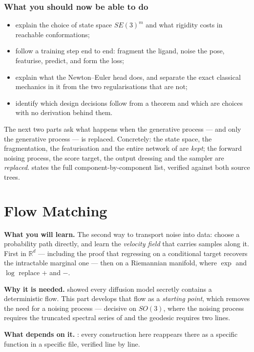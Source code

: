 \documentclass[11pt,a4paper]{report}
\theoremstyle{definition}
\theoremstyle{remark}
\newcommand{\RR}{\mathbb R}
\begin{document}
\section{What you should now be able to do}

\begin{itemize}[nosep]
\item explain the choice of state space $SE(3)^m$ and what rigidity costs in reachable conformations;
\item follow a training step end to end: fragment the ligand, noise the pose, featurise, predict, and form the loss;
\item explain what the Newton--Euler head does, and separate the exact classical mechanics in it from the two regularisations that are not;
\item identify which design decisions follow from a theorem and which are choices with no derivation behind them.
\end{itemize}

The next two parts ask what happens when the generative process --- and only the generative process --- is replaced. Concretely: the state space, the fragmentation, the featurisation and the entire network of  are \emph{kept}; the forward noising process, the score target, the output dressing and the sampler are \emph{replaced}.  states the full component-by-component list, verified against both source trees.

\clearpage

\part{Flow Matching}
\label{part:flow-matching}


\begin{tcolorbox}[colback=gray!4,colframe=gray!55!black,
  title=Part VI at a glance, fonttitle=\bfseries, breakable]
\textbf{What you will learn.} The second way to transport noise into data: choose a probability path directly, and learn the \emph{velocity field} that carries samples along it. First in $\RR^d$ --- including the proof that regressing on a conditional target recovers the intractable marginal one --- then on a Riemannian manifold, where $\exp$ and $\log$ replace $+$ and $-$.

\textbf{Why it is needed.}  showed every diffusion model secretly contains a deterministic flow. This part develops that flow as a \emph{starting point}, which removes the need for a noising process --- decisive on $SO(3)$, where the noising process requires the truncated spectral series of  and the geodesic requires two lines.

\textbf{What depends on it.} : every construction here reappears there as a specific function in a specific file, verified line by line.
\end{tcolorbox}
\end{document}
